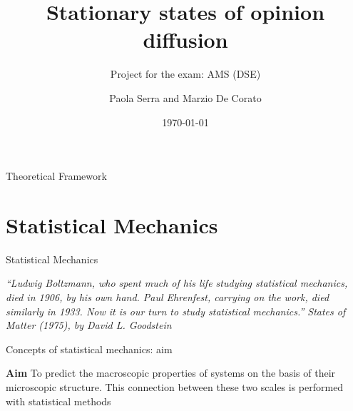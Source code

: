 \documentclass{beamer}
\title[AMS project]{ Stationary states of opinion diffusion}
\subtitle{Project for the exam: AMS (DSE)}
\author{Paola Serra and Marzio De Corato }
\date{\today}
\begin{document}
\begin{frame}
\vspace{+4 cm}  \titlepage
\end{frame}

\usebackgroundtemplate{ } 






\begin{frame}{}
\begin{center}
{\Huge Theoretical Framework}
\end{center}
\end{frame}


\section{Statistical Mechanics}

\begin{frame}{}
\begin{center}
{\Huge Statistical Mechanics}
\end{center}
\begin{center}
\textit{“Ludwig Boltzmann, who spent much of his life studying statistical mechanics, died in 1906, by his own hand. Paul Ehrenfest, carrying on the work, died similarly in 1933. Now it is our turn to study statistical mechanics.” States of Matter (1975), by David L. Goodstein}
\end{center}
\end{frame}


\begin{frame}{Concepts of statistical mechanics: aim \cite{peliti2011statistical}}
\begin{center}
\textbf{Aim} To predict the macroscopic properties of systems on the basis of their microscopic structure. This connection between these two scales is performed with statistical methods
\end{center}
\end{frame}
\end{document}
